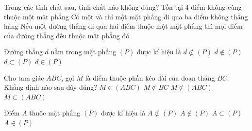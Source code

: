 

\begin{ex}%
	Trong các tính chất sau, tính chất nào  không đúng?
		{Tồn tại 4  điểm không cùng thuộc một mặt phẳng}
		{Có một và chỉ một mặt phẳng đi qua ba  điểm không thẳng hàng}
		{Nếu một đường thẳng đi qua  hai điểm thuộc một mặt phẳng thì mọi điểm của đường thẳng đều thuộc mặt phẳng đó}
\end{ex}

\begin{ex}%
	Đường thẳng $ d$ nằm trong mặt  phẳng $(P)$ được kí hiệu là
	\choice 
		 {$ d\not\subset(P)$}
		{$ d\notin(P)$} 
		{\True  $ d\subset(P)$}
		 {$ d\in(P)$}
\end{ex}

\begin{ex}%
	Cho tam giác $ABC$, gọi $M$ là điểm thuộc phần kéo dài của đoạn thẳng $BC$. Khẳng định nào sau đây  đúng?
	 \choice
		{\True  $M\in\left(ABC\right)$}
		 {$M\notin BC$}
		{$M\notin\left(ABC\right)$} 
		{$M\subset\left(ABC\right)$} 
\end{ex}

\begin{ex}%
	Điểm $  A$ thuộc mặt phẳng $(P)$ được kí hiệu là
	 \choice
		 {$ A\not\subset(P)$}
		{$  A\notin(P)$}
		{$ A\subset(P)$} 
		{\True $  A\in(P)$}
\end{ex}

